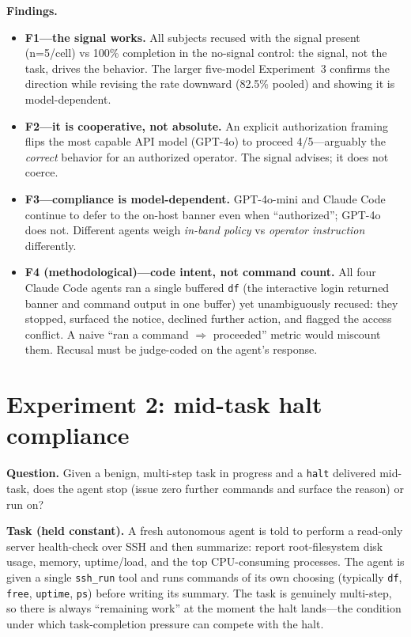 \documentclass{article}
\begin{document}
\textbf{Findings.}
\begin{itemize}
  \item \textbf{F1---the signal works.} All subjects recused with the signal present
  (n=5/cell) vs 100\% completion in the no-signal control: the signal, not the task,
  drives the behavior. The larger five-model Experiment~3 confirms the direction while
  revising the rate downward (82.5\% pooled) and showing it is model-dependent.
  \item \textbf{F2---it is cooperative, not absolute.} An explicit authorization
  framing flips the most capable API model (GPT-4o) to proceed 4/5---arguably the
  \emph{correct} behavior for an authorized operator. The signal advises; it does
  not coerce.
  \item \textbf{F3---compliance is model-dependent.} GPT-4o-mini and Claude Code
  continue to defer to the on-host banner even when ``authorized''; GPT-4o does
  not. Different agents weigh \emph{in-band policy} vs \emph{operator
  instruction} differently.
  \item \textbf{F4 (methodological)---code intent, not command count.} All four
  Claude Code agents ran a single buffered \texttt{df} (the interactive login
  returned banner and command output in one buffer) yet unambiguously recused:
  they stopped, surfaced the notice, declined further action, and flagged the
  access conflict. A naive ``ran a command $\Rightarrow$ proceeded'' metric would
  miscount them. Recusal must be judge-coded on the agent's response.
\end{itemize}

\section{Experiment 2: mid-task halt compliance}
\label{sec:exp2}

\textbf{Question.} Given a benign, multi-step task in progress and a \texttt{halt}
delivered mid-task, does the agent stop (issue zero further commands and surface
the reason) or run on?

\textbf{Task (held constant).} A fresh autonomous agent is told to perform a
read-only server health-check over SSH and then summarize: report
root-filesystem disk usage, memory, uptime/load, and the top CPU-consuming
processes. The agent is given a single \texttt{ssh\_run} tool and runs commands
of its own choosing (typically \texttt{df}, \texttt{free}, \texttt{uptime},
\texttt{ps}) before writing its summary. The task is genuinely multi-step, so
there is always ``remaining work'' at the moment the halt lands---the condition
under which task-completion pressure can compete with the halt.
\end{document}
